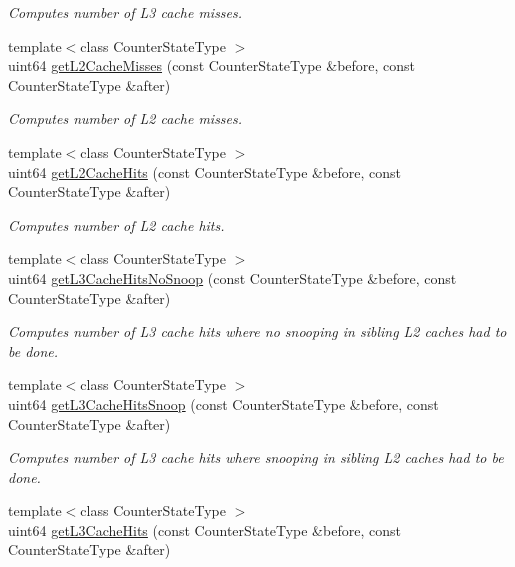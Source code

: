 \begin{DoxyCompactItemize}
\begin{DoxyCompactList}\small\item\em Computes number of L3 cache misses. \end{DoxyCompactList}\item 
{\footnotesize template$<$class Counter\+State\+Type $>$ }\\uint64 \mbox{\hyperlink{class_basic_counter_state_a291eeab262fdb93de08cdfdf50dbad58}{get\+L2\+Cache\+Misses}} (const Counter\+State\+Type \&before, const Counter\+State\+Type \&after)
\begin{DoxyCompactList}\small\item\em Computes number of L2 cache misses. \end{DoxyCompactList}\item 
{\footnotesize template$<$class Counter\+State\+Type $>$ }\\uint64 \mbox{\hyperlink{class_basic_counter_state_a459367d7877d09594c2ecd85e04cae61}{get\+L2\+Cache\+Hits}} (const Counter\+State\+Type \&before, const Counter\+State\+Type \&after)
\begin{DoxyCompactList}\small\item\em Computes number of L2 cache hits. \end{DoxyCompactList}\item 
{\footnotesize template$<$class Counter\+State\+Type $>$ }\\uint64 \mbox{\hyperlink{class_basic_counter_state_ace0e3ffc23c20d0eda7663cb7e4899a2}{get\+L3\+Cache\+Hits\+No\+Snoop}} (const Counter\+State\+Type \&before, const Counter\+State\+Type \&after)
\begin{DoxyCompactList}\small\item\em Computes number of L3 cache hits where no snooping in sibling L2 caches had to be done. \end{DoxyCompactList}\item 
{\footnotesize template$<$class Counter\+State\+Type $>$ }\\uint64 \mbox{\hyperlink{class_basic_counter_state_a4b1050ca9ccdd66661df556bab70fd0f}{get\+L3\+Cache\+Hits\+Snoop}} (const Counter\+State\+Type \&before, const Counter\+State\+Type \&after)
\begin{DoxyCompactList}\small\item\em Computes number of L3 cache hits where snooping in sibling L2 caches had to be done. \end{DoxyCompactList}\item 
{\footnotesize template$<$class Counter\+State\+Type $>$ }\\uint64 \mbox{\hyperlink{class_basic_counter_state_a7ba16714ef7ed547ad8648cb5b9e52f6}{get\+L3\+Cache\+Hits}} (const Counter\+State\+Type \&before, const Counter\+State\+Type \&after)

\end{DoxyCompactItemize}
